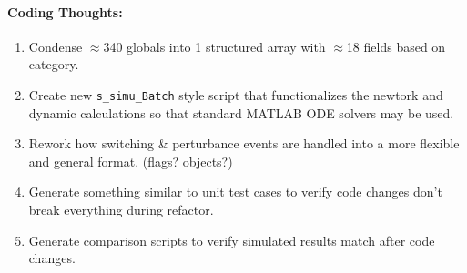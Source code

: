 \documentclass[12pt]{article}
\begin{document}
\begin{multicols}{2}
\paragraph{Coding Thoughts:} 
	\begin{enumerate}

		\itemsep 0em 
		\item Condense $\approx$340 globals into 1 structured array with $\approx$18 fields based on category.
		\item Create new \verb|s_simu_Batch| style script that functionalizes the newtork and dynamic calculations so that standard MATLAB ODE solvers may be used.
		\item Rework how switching \& perturbance events are handled into a more flexible and general format. (flags? objects?)
		\item Generate something similar to unit test cases to verify code changes don't break everything during refactor.
		\item Generate comparison scripts to verify simulated results match after code changes.

	\end{enumerate}
	
\pagebreak

\end{multicols}
\end{document}
